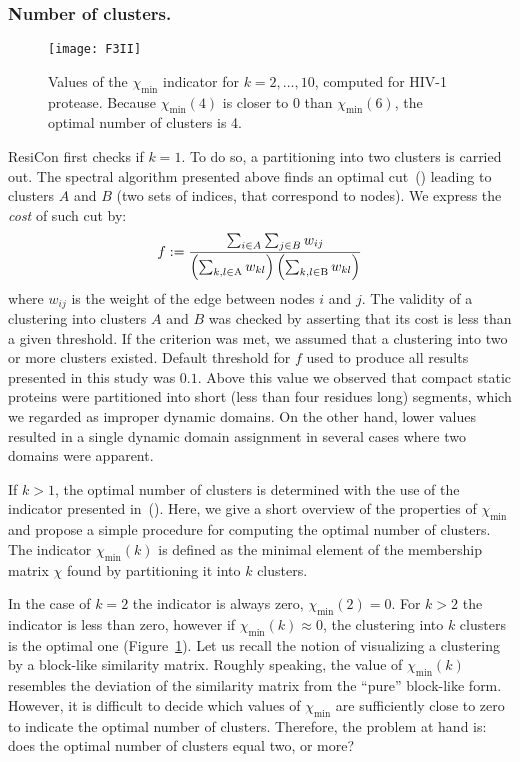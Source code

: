 \subsubsection*{Number of clusters.}
\begin{figure}
\centering
\texttt{[image: F3II]}
\caption{
Values of the $\chi_{\text{min}}$ indicator for $k=2,\ldots,10$, computed for HIV-1 protease.
Because $\chi_{\text{min}}(4)$ is closer to 0 than $\chi_{\text{min}}(6)$, the optimal number of clusters is 4.
}
\label{minChiList}
\end{figure}
ResiCon first checks if $k=1$.
To do so, a partitioning into two clusters is carried out.
The spectral algorithm presented above finds an optimal cut~(\cite{weber2004perron}) leading to clusters $A$ and $B$ (two sets of indices, that correspond to nodes).
We express the \emph{cost} of such cut by:
\begin{displaymath}
f :=  \frac{\sum_{i \in A}\sum_{j \in B} w_{ij}}{\left ( \sum_{k,l \in \text{A}} w_{kl} \right ) \left ( \sum_{k,l \in \text{B}} w_{kl}   \right )} \\
\end{displaymath}
where $w_{ij}$ is the weight of the edge between nodes $i$ and $j$.
The validity of a clustering into clusters $A$ and $B$ was checked by asserting that its cost is less than a given threshold.
If the criterion was met, we assumed that a clustering into two or more clusters existed.
Default threshold for $f$ used to produce all results presented in this study was $0.1$. 
Above this value we observed that compact static proteins were partitioned into short (less than four residues long) segments, which we regarded as improper dynamic domains.
On the other hand, lower values resulted in a single dynamic domain assignment in several cases where two domains were apparent.

If $k>1$, the optimal number of clusters is determined with the use of the indicator presented in~(\cite{weber2004perron}).
Here, we give a short overview of the properties of $\chi_{\text{min}}$ and propose a simple procedure for computing the optimal number of clusters.
The indicator $\chi_{\text{min}}(k)$ is defined as the minimal element of the membership matrix $\chi$ found by partitioning it into $k$ clusters.

In the case of $k=2$ the indicator is always zero, $\chi_\text{min}(2)=0$.
For $k>2$ the indicator is less than zero, however if $\chi_\text{min}(k)\approx 0$, the clustering into $k$ clusters is the optimal one (Figure~\ref{minChiList}).
Let us recall the notion of visualizing a clustering by a block-like similarity matrix.
Roughly speaking, the value of $\chi_\text{min}(k)$ resembles the deviation of the similarity matrix from the ``pure'' block-like form.
However, it is difficult to decide which values of $\chi_\text{min}$ are sufficiently close to zero to indicate the optimal number of clusters.
Therefore, the problem at hand is: does the optimal number of clusters equal two, or more?

